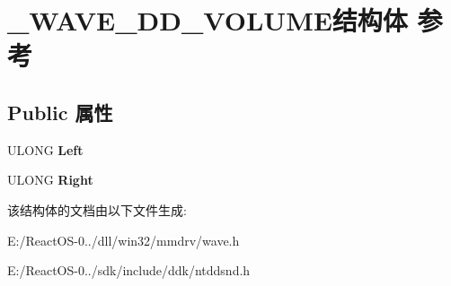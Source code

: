 \hypertarget{struct___w_a_v_e___d_d___v_o_l_u_m_e}{}\section{\+\_\+\+W\+A\+V\+E\+\_\+\+D\+D\+\_\+\+V\+O\+L\+U\+M\+E结构体 参考}
\label{struct___w_a_v_e___d_d___v_o_l_u_m_e}
\subsection*{Public 属性}
\begin{DoxyCompactItemize}
\item 
\mbox{\label{struct___w_a_v_e___d_d___v_o_l_u_m_e_a92375564bd8624616af04f910a41f193}} 
U\+L\+O\+NG {\bfseries Left}
\item 
\mbox{\label{struct___w_a_v_e___d_d___v_o_l_u_m_e_a429d2cfe28192c7bfb301fae19fe8d58}} 
U\+L\+O\+NG {\bfseries Right}
\end{DoxyCompactItemize}


该结构体的文档由以下文件生成\+:\begin{DoxyCompactItemize}
\item 
E\+:/\+React\+O\+S-\/0../dll/win32/mmdrv/wave.\+h\item 
E\+:/\+React\+O\+S-\/0../sdk/include/ddk/ntddsnd.\+h\end{DoxyCompactItemize}
